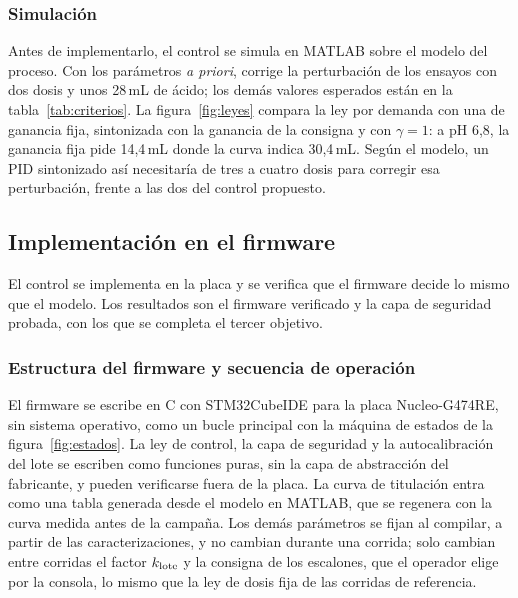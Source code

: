 \subsubsection{Simulación}\label{sec:simulacion}
Antes de implementarlo, el control se simula en MATLAB sobre el modelo del proceso. Con los parámetros \emph{a priori}, corrige la perturbación de los ensayos con dos dosis y unos 28\,mL de ácido; los demás valores esperados están en la tabla~\ref{tab:criterios}. La figura~\ref{fig:leyes} compara la ley por demanda con una de ganancia fija, sintonizada con la ganancia de la consigna y con $\gamma=1$: a pH 6,8, la ganancia fija pide 14,4\,mL donde la curva indica 30,4\,mL. Según el modelo, un PID sintonizado así necesitaría de tres a cuatro dosis para corregir esa perturbación, frente a las dos del control propuesto.


\subsection{Implementación en el firmware}\label{sec:fw}

El control se implementa en la placa y se verifica que el firmware decide lo mismo que el modelo. Los resultados son el firmware verificado y la capa de seguridad probada, con los que se completa el tercer objetivo.

\subsubsection{Estructura del firmware y secuencia de operación}\label{sec:estructura}
El firmware se escribe en C con STM32CubeIDE para la placa Nucleo-G474RE, sin sistema operativo, como un bucle principal con la máquina de estados de la figura~\ref{fig:estados}. La ley de control, la capa de seguridad y la autocalibración del lote se escriben como funciones puras, sin la capa de abstracción del fabricante, y pueden verificarse fuera de la placa. La curva de titulación entra como una tabla generada desde el modelo en MATLAB, que se regenera con la curva medida antes de la campaña. Los demás parámetros se fijan al compilar, a partir de las caracterizaciones, y no cambian durante una corrida; solo cambian entre corridas el factor $k_{\text{lote}}$ y la consigna de los escalones, que el operador elige por la consola, lo mismo que la ley de dosis fija de las corridas de referencia.

